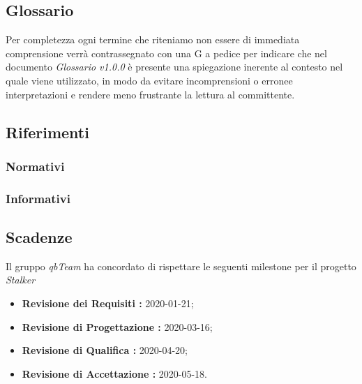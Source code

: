 \subsection{Glossario}
Per completezza ogni termine che riteniamo non essere di immediata comprensione verrà contrassegnato con una G a pedice per indicare che nel documento \textit{Glossario v1.0.0} è presente una spiegazione inerente al contesto nel quale viene utilizzato,
in modo da evitare incomprensioni o erronee interpretazioni e rendere meno frustrante la lettura al committente.

\subsection{Riferimenti}
\subsubsection{Normativi}
\subsubsection{Informativi}

\subsection{Scadenze}
Il gruppo \textit{qbTeam} ha concordato di rispettare le seguenti milestone per il progetto \textit{Stalker}
\begin{itemize}
    \item \textbf{Revisione dei Requisiti : } 2020-01-21;
    \item \textbf{Revisione di Progettazione : } 2020-03-16;
    \item \textbf{Revisione di Qualifica : } 2020-04-20;
    \item \textbf{Revisione di Accettazione : } 2020-05-18.
\end{itemize}